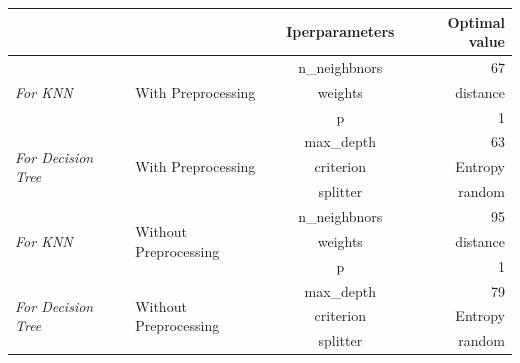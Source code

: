 \begin{table}[ht]
\centering
\begin{tabular}{@{}ll|c|r|@{}}
\cmidrule(l){3-4}
                                                                  &                                        & \multicolumn{1}{l|}{\textbf{Iperparameters}} & \textbf{Optimal value} \\ \midrule
\multicolumn{1}{|l|}{\multirow{3}{*}{\textit{For KNN}}}           & \multirow{3}{*}{With Preprocessing}    & n\_neighbnors                                & 67                     \\ \cmidrule(l){3-4} 
\multicolumn{1}{|l|}{}                                            &                                        & weights                                      & distance               \\ \cmidrule(l){3-4} 
\multicolumn{1}{|l|}{}                                            &                                        & p                                            & 1                      \\ \midrule
\multicolumn{1}{|l|}{\multirow{3}{*}{\textit{For Decision Tree}}} & \multirow{3}{*}{With Preprocessing}    & max\_depth                                   & 63                     \\ \cmidrule(l){3-4} 
\multicolumn{1}{|l|}{}                                            &                                        & criterion                                    & Entropy                \\ \cmidrule(l){3-4} 
\multicolumn{1}{|l|}{}                                            &                                        & splitter                                     & random                 \\ \midrule
\multicolumn{1}{|l|}{\multirow{3}{*}{\textit{For KNN}}}           & \multirow{3}{*}{Without Preprocessing} & n\_neighbnors                                & 95                     \\ \cmidrule(l){3-4} 
\multicolumn{1}{|l|}{}                                            &                                        & weights                                      & distance               \\ \cmidrule(l){3-4} 
\multicolumn{1}{|l|}{}                                            &                                        & p                                            & 1                      \\ \midrule
\multicolumn{1}{|l|}{\multirow{3}{*}{\textit{For Decision Tree}}} & \multirow{3}{*}{Without Preprocessing} & max\_depth                                   & 79                     \\ \cmidrule(l){3-4} 
\multicolumn{1}{|l|}{}                                            &                                        & criterion                                    & Entropy                \\ \cmidrule(l){3-4} 
\multicolumn{1}{|l|}{}                                            &                                        & splitter                                     & random                 \\ \bottomrule
\end{tabular}
\end{table}

